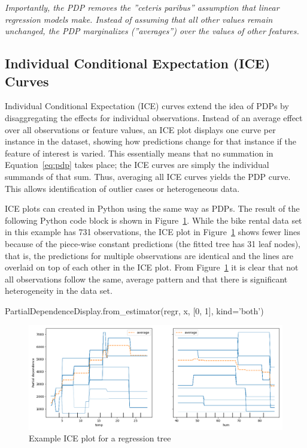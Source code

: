 \emph{Importantly, the PDP removes the ''ceteris paribus'' assumption that linear regression models make. Instead of assuming that all other values remain unchanged, the PDP marginalizes (''averages'') over the values of other features.}

\subsection{Individual Conditional Expectation (ICE) Curves}

Individual Conditional Expectation (ICE) curves extend the idea of PDPs by disaggregating the effects for individual observations. Instead of an average effect over all observations or feature values, an ICE plot displays one curve per instance in the dataset, showing how predictions change for that instance if the feature of interest is varied. This essentially means that no summation in Equation~\ref{eq:pdp} takes place; the ICE curves are simply the individual summands of that sum. Thus, averaging all ICE curves yields the PDP curve. This allows identification of outlier cases or heterogeneous data. 

ICE plots can created in Python using the same way as PDPs. The result of the following Python code block is shown in Figure~\ref{fig:ice}. While the bike rental data set in this example has 731 observations, the ICE plot in Figure~\ref{fig:ice} shows fewer lines because of the piece-wise constant predictions (the fitted tree has 31 leaf nodes), that is, the predictions for multiple observations are identical and the lines are overlaid on top of each other in the ICE plot. From Figure~\ref{fig:ice} it is clear that not all observations follow the same, average pattern and that there is significant heterogeneity in the data set.

\begin{pythoncode}
PartialDependenceDisplay.from_estimator(regr, x, [0, 1], kind='both')
\end{pythoncode}

\begin{figure}
\centering

\includegraphics[width=.75\textwidth]{ice_pdp_reg.png}
\caption{Example ICE plot for a regression tree}
\label{fig:ice}
\end{figure}



